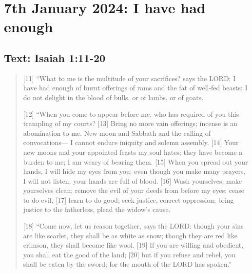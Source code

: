 \setcounter{figure}{0}

\section{7th January 2024: I have had enough}
\subsection*{Text: Isaiah 1:11-20}
  \begin{quote}
    [11] “What to me is the multitude of your sacrifices?
        says the LORD;
    I have had enough of burnt offerings of rams
        and the fat of well-fed beasts;
    I do not delight in the blood of bulls,
        or of lambs, or of goats.


    [12] “When you come to appear before me,
        who has required of you
        this trampling of my courts?
    [13] Bring no more vain offerings;
        incense is an abomination to me.
    New moon and Sabbath and the calling of convocations—
        I cannot endure iniquity and solemn assembly.
    [14] Your new moons and your appointed feasts
        my soul hates;
    they have become a burden to me;
        I am weary of bearing them.
    [15] When you spread out your hands,
        I will hide my eyes from you;
    even though you make many prayers,
        I will not listen;
        your hands are full of blood.
    [16] Wash yourselves; make yourselves clean;
        remove the evil of your deeds from before my eyes;
    cease to do evil,
    [17]     learn to do good;
    seek justice,
        correct oppression;
    bring justice to the fatherless,
        plead the widow’s cause.


    [18] “Come now, let us reason together, says the LORD:
    though your sins are like scarlet,
        they shall be as white as snow;
    though they are red like crimson,
        they shall become like wool.
    [19] If you are willing and obedient,
        you shall eat the good of the land;
    [20] but if you refuse and rebel,
        you shall be eaten by the sword;
        for the mouth of the LORD has spoken.”
  \end{quote}
